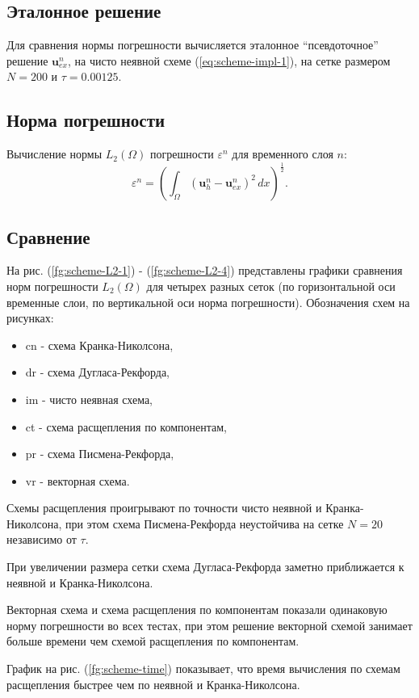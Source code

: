 \documentclass[12pt]{article}
\begin{document}
\subsection{Эталонное решение}
Для сравнения нормы погрешности вычисляется эталонное ``псевдоточное'' решение ${\bm u}_{ex}^n$, на чисто неявной схеме (\ref{eq:scheme-impl-1}), на сетке размером $N=200$ и $\tau=0.00125$.

\subsection{Норма погрешности}
Вычисление нормы $L_2(\Omega)$ погрешности $\varepsilon^n$ для временного слоя $n$:
$$
\varepsilon^n = \left(\int_{\Omega} ({\bm u}_h^n - {\bm u}_{ex}^n )^2 \, dx\right)^{\frac{1}{2}}.
$$

\subsection{Сравнение}
На рис. (\ref{fg:scheme-L2-1}) - (\ref{fg:scheme-L2-4}) представлены графики сравнения норм погрешности $L_2(\Omega)$  для четырех разных сеток (по горизонтальной оси временные слои, по вертикальной оси норма погрешности). Обозначения схем на рисунках:
\begin{itemize}
\item cn - схема Кранка-Николсона,
\item dr - схема Дугласа-Рекфорда,
\item im - чисто неявная схема,
\item ct - схема расщепления по компонентам,
\item pr - схема Писмена-Рекфорда,
\item vr - векторная схема.
\end{itemize}

Схемы расщепления проигрывают по точности чисто неявной и Кранка-Николсона, при этом  схема Писмена-Рекфорда неустойчива на сетке $N=20$ независимо от $\tau$. 

При увеличении размера сетки схема Дугласа-Рекфорда заметно приближается к неявной и Кранка-Николсона.

Векторная схема и схема расщепления по компонентам показали одинаковую норму погрешности во всех тестах, при этом решение векторной схемой занимает больше времени чем схемой расщепления по компонентам.

График на рис. (\ref{fg:scheme-time}) показывает, что время вычисления по схемам расщепления быстрее чем по неявной и Кранка-Николсона. 
\end{document}
